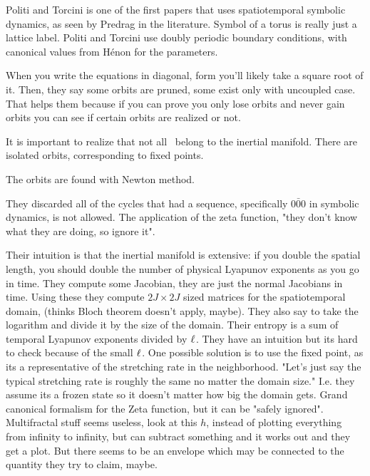 Politi and Torcini is one of the first papers that uses
spatiotemporal symbolic dynamics, as seen by Predrag in the literature.
Symbol of a torus is really just a lattice label. Politi and Torcini use
doubly periodic boundary conditions, with canonical values from H\'enon
for the parameters.

When you write the equations in diagonal,
form you'll likely take a square root of it. Then, they say some orbits are pruned,
some exist only with uncoupled case. That helps them because if you can prove you only
lose orbits and never gain orbits you can see if certain orbits are realized or not.

It is important to realize that not all \twots\ belong to the
inertial manifold. There are isolated orbits, corresponding to fixed points.

The orbits are found with Newton method.

They discarded all of the cycles that had a sequence, specifically
$\bar{000}$ in symbolic dynamics, is not allowed. The application of the
zeta function, "they don't know what they are doing, so ignore it".

Their intuition is that the inertial manifold is extensive: if you double the spatial
length, you should double the number of physical Lyapunov exponents as you go
in time. They compute some Jacobian, they are just the normal Jacobians
in time. Using these they compute $2J \times 2J$ sized matrices for the spatiotemporal
domain, (thinks Bloch theorem doesn't apply, maybe).
They also say to take the logarithm and divide it
by the size of the domain. Their entropy is a sum of temporal Lyapunov exponents
divided by
${\ell_{}}$. They have an intuition but its hard to check because of the small ${\ell_{}}$. One possible
solution is to use the fixed point, as its a representative of the stretching rate
in the neighborhood. "Let's just say the typical stretching rate is roughly the same no
matter the domain size." I.e. they assume its a frozen state so it doesn't matter how
big the domain gets. Grand canonical formalism for the Zeta function, but it can
be "safely ignored". Multifractal stuff seems useless, look at this $h$, instead
of plotting everything from infinity to infinity, but can subtract something and
it works out and they get a plot. But there seems to be an envelope which
may be connected to the quantity they try to claim, maybe.

